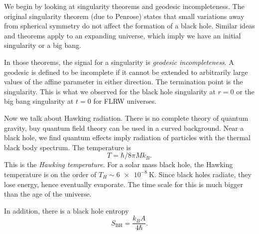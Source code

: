 \documentclass[12pt]{article}
\begin{document}
We begin by looking at singularity theorems and geodesic incompleteness. The original singularity theorem (due to Penrose) states that small variations away from spherical symmetry do not affect the formation of a black hole. Similar ideas and theorems apply to an expanding universe, which imply we have an initial singularity or a big bang.

In those theorems, the signal for a singularity is \emph{geodesic incompleteness}. A geodesic is defined to be incomplete if it cannot be extended to arbitrarily large values of the affine parameter in either direction. The termination point is the singularity. This is what we observed for the black hole singularity at $r = 0$ or the big bang singularity at $t = 0$ for FLRW universes.

Now we talk about Hawking radiation. There is no complete theory of quantum gravity, buy quantum field theory can be used in a curved background. Near a black hole, we find quantum effects imply radiation of particles with the thermal black body spectrum. The temperature is
\[
T = \hbar /8 \pi M k_B.
\]
This is the \emph{Hawking temperature}. For a solar mass black hole, the Hawking temperature is on the order of $T_H \sim \qty{6e-8}{\kelvin}$. Since black holes radiate, they lose energy, hence eventually evaporate. The time scale for this is much bigger than the age of the universe.

In addition, there is a black hole entropy
\[
	S_{\mathrm{BH}} = \frac{k_B A}{4 \hbar}.
\]


\newpage

\printindex
\end{document}
